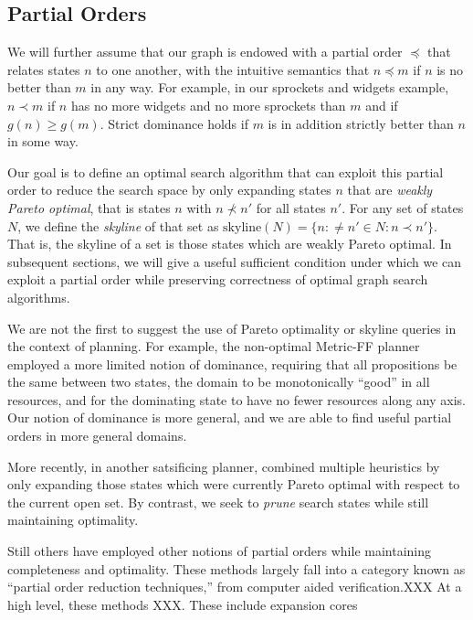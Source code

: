 \documentclass[letterpaper]{article}
\theoremstyle{plain} \newtheorem{theorem}{Theorem} \newtheorem{proposition}{Proposition} \newtheorem{lemma}{Lemma}
\theoremstyle{definition} \newtheorem{definition}{Definition} \newtheorem{conjecture}{Conjecture} \newtheorem*{example}{Example}
\theoremstyle{remark} \newtheorem*{remark}{Remark} \newtheorem*{note}{Note} \newtheorem{case}{Case}
\begin{document}
\subsection{Partial Orders}

We will further assume that our graph is endowed with a partial order $\preceq$
that relates states $n$ to one another, with the intuitive semantics that
$n \preceq m$ if $n$ is no better than $m$ in any way. For example, in
our sprockets and widgets example, $n \prec m$ if $n$ has no more widgets and
no more sprockets than $m$ and if $g(n) \ge g(m)$. Strict dominance
holds if $m$ is in addition strictly better than $n$ in some way.

Our goal is to define an optimal search algorithm that can exploit
this partial order to reduce the search space by only expanding
states $n$ that are \textit{weakly Pareto optimal}, that is states
$n$ with $n \nprec n'$ for all states $n'$. For any set of states
$N$, we define the \textit{skyline} of that set as
$\textrm{skyline}(N)=\{n: \ne n' \in N: n \prec n'\}$. That is, the
skyline of a set is those states which are weakly Pareto optimal.
In subsequent sections, we will give a useful sufficient condition
under which we can exploit a partial order while preserving correctness
of optimal graph search algorithms.

We are not the first to suggest the use of Pareto optimality or
skyline queries in the context of planning. For example, the
non-optimal Metric-FF planner~\cite{hoffmann2003metric} employed a
more limited notion of dominance, requiring that all propositions
be the same between two states, the domain to be monotonically
``good'' in all resources, and for the dominating state to have no
fewer resources along any axis. Our notion of dominance is more
general, and we are able to find useful partial orders in more general
domains.

More recently, in another satsificing planner, \citet{roger2010more}
combined multiple heuristics by only expanding those states which
were currently Pareto optimal with respect to the current open set.
By contrast, we seek to \textit{prune} search states while still
maintaining optimality.

Still others have employed other notions of partial orders while
maintaining completeness and optimality. These methods largely
fall into a category known as ``partial order reduction
techniques,'' from computer aided verification.XXX At a high level,
these methods XXX. These include expansion cores \cite{chen09completeness, xu11theory}
\end{document}

